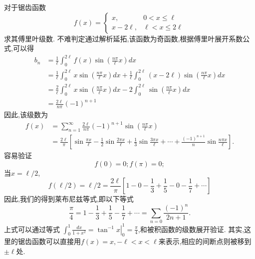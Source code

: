 \begin{examplebox}{
对于锯齿函数
\[  
f(x)= \begin{cases}
  x,   &  0 < x \leq  \ell 
  \\
  x - 2 \ell,   & \ell < x \leq 2\ell
\end{cases}
\]
求其傅里叶级数.
}
不难判定通过解析延拓,该函数为奇函数,根据傅里叶展开系数公式,可以得
\begin{align}
b_n &=   \frac{1}{\ell} \int_{0}^{2\ell} f(x) \sin {  \left( \frac{n\pi}{\ell} x \right) } dx \nonumber
\\
&= \frac{1}{\ell} \int_{0}^{2\ell} x  \sin {  \left( \frac{n\pi}{\ell} x \right) } dx \nonumber
  +
 \frac{1}{\ell} \int_{0}^{2\ell} (x - 2\ell) \sin {  \left( \frac{n\pi}{\ell} x \right) } dx \nonumber
 \\ 
 &= \frac{2}{\ell} \int_{0}^{2\ell} x \sin {  \left( \frac{n\pi}{\ell} x \right) } dx \nonumber
 -2 \int_{0}^{2\ell}   \sin {  \left( \frac{n\pi}{\ell} x \right) } dx \nonumber
 \\
 & = \frac{2\ell}{n\pi} (-1)^{n+1}  \nonumber
\end{align}
因此,该级数为
\begin{align}
f(x) &=  \sum_{n=1}^{\infty} \frac{2 \ell }{n\pi} (-1)^{n+1} \sin {  \left( \frac{n\pi}{\ell} x \right) }  \nonumber
\\
 & =\frac{2\ell}{\pi} \left[ \sin{\frac{\pi x}{\ell} } - \frac{1}{2}\sin{\frac{2\pi x}{\ell} } 
  +  \frac{1}{3}\sin{\frac{3\pi x}{\ell} } + \cdots + \frac{(-1)^{n+1}}{n}\sin{\frac{n\pi x}{\ell} }
 \right] \nonumber
.
\end{align}
容易验证
\[
  f(0) = 0; f(\pi) = 0;
\]
当$x=\ell/2$, 
\[
f(\ell/2) = \ell/2 =   \frac{2\ell}{\pi} \left[ 1 - 0 - \frac{1}{3} + \frac{1}{5} - 0 -\frac{1}{7}+ \cdots \right]
\]
因此,我们的得到莱布尼兹等式,即以下等式
\[
\frac{\pi}{4} = 1-\frac{1}{3} + \frac{1}{5} - \frac{1}{7} + \cdots = \sum_{n=0} \frac{(-1)^n}{2n + 1} .
\]
上式可以通过等式
$\int_0^1 \frac{d x}{1+x^2}=\left.\tan ^{-1} x\right|_0 ^1=\frac{\pi}{4}$,和被积函数的级数展开验证.
其实,这里的锯齿函数可以直接用$f(x) = x, -\ell < x < \ell$来表示,相应的间断点则被移到$\pm \ell$处.
\end{examplebox}


